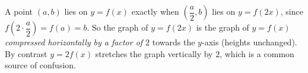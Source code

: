 A point $(a,b)$ lies on $y=f(x)$ exactly when $\left(\dfrac {a}{2},b\right)$ lies on $y=f(2x)$, since $f\left(2\cdot\dfrac {a}{2}\right)=f(a)=b$. So the graph of $y=f(2x)$ is the graph of $y=f(x)$ \emph{compressed horizontally by a factor of $2$} towards the $y$-axis (heights unchanged). By contrast $y=2f(x)$ stretches the graph vertically by $2$, which is a common source of confusion.
